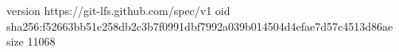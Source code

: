version https://git-lfs.github.com/spec/v1
oid sha256:f52663bb51c258db2c3b7f0991dbf7992a039b014504d4efae7d57c4513d86ae
size 11068
